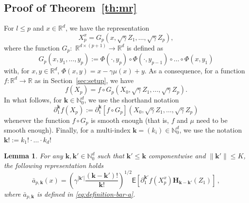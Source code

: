 \documentclass[bj]{imsart}
\def\PE{\mathsf{E}}
\def\rset{\mathbb{R}}
\def\rset{\mathbb{R}}
\newtheorem{lem}[thm]{Lemma}
\def\eqsp{\,}
\begin{document}
\subsection{Proof of Theorem~\ref{th:mr}}
For $l\le p$ and $x \in \rset^d$, we have the representation
\[
X^x_{p}=G_{p}(x,\sqrt{\gamma}Z_{1},\ldots,\sqrt{\gamma}Z_{p}),
\]
where the function \(G_{p}:\) \(\mathbb{R}^{d\times(p+1)}\to \mathbb{R}^{d}\) is defined as
\begin{equation}
\label{eq:definition-G-p-l}
G_{p}(x,y_1,\ldots,y_p):=\Phi(\cdot,y_{p})\circ\Phi(\cdot,y_{p-1})\circ\ldots\circ\Phi(x,y_{1})
\end{equation}
with, for $x,y\in\mathbb R^d$,   $\Phi(x,y)=x-\gamma\mu(x)+y$.
As a consequence, for a function $f\colon\mathbb R^d\to\mathbb R$
as in Section~\ref{sec:setup}, we have
$$
f\left(X_{p}\right) =f\circ G_{p}(X_{0},\sqrt{\gamma}Z_{1},\ldots,\sqrt{\gamma}Z_{p}).
$$
In what follows, for $\mathbf{k}\in\mathbb N_0^d$,
we use the shorthand notation
\begin{equation}
\label{eq:definition-differential-f-p}
\partial_{1}^{\mathbf k} f\left(X_{p}\right)
:=\partial_{1}^{\mathbf k} [f\circ G_{p}](X_{0},\sqrt{\gamma}Z_{1},\ldots,\sqrt{\gamma}Z_{p})
\end{equation}
whenever the function $f\circ G_{p}$ is smooth enough
(that is, $f$ and $\mu$ need to be smooth enough).
Finally, for a multi-index $\mathbf{k}=(k_i)\in\mathbb N_0^d$, we use the notation
\(\mathbf{k} ! :=k_1!\cdot\ldots\cdot k_d !\)

\begin{lem}\label{eq:a_repr}
For any \(\mathbf{k},\mathbf{k}'\in \mathbb{N}_0^d\) such that \(\mathbf{k}'\le \mathbf{k}\) componentwise and $\| \mathbf{k}' \| \leq K$, the following representation holds
\[
\bar a_{p,\mathbf{k}}(x)=\left(\gamma^{|\mathbf{k}'|}\frac{(\mathbf{k}-\mathbf{k}') !}{\mathbf{k}!}\right)^{1/2}
\PE\left[
\partial_{1}^{\mathbf{k}'}f(X^x_p)\mathbf{H}_{\mathbf{k}-\mathbf{k}'}(Z_1)\right] \eqsp,
\]
where $\bar a_{p,\mathbf{k}}$ is defined in \eqref{eq:definition-bar-a}.
\end{lem}
\end{document}
